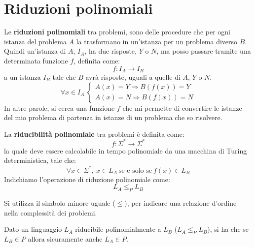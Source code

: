 \section{Riduzioni polinomiali}
Le \textbf{riduzioni polinomiali} tra problemi, sono delle procedure che per ogni
istanza del problema $A$ la trasformano in un'istanza per un problema diverso $B$.
Quindi un'istanza di $A$, $I_A$, ha due risposte, $Y$ o $N$, ma posso passare
tramite una determinata funzione $f$, definita come:
\begin{equation}
    f: I_A \to I_B
\end{equation}
a un istanza $I_B$ tale che $B$ avrà risposte, uguali a quelle di $A$, $Y$ o $N$.
\begin{equation}
    \forall x \in I_A \ \begin{cases}
        A(x) = Y \Rightarrow B(f(x)) = Y \\
        A(x) = N \Rightarrow B(f(x)) = N
    \end{cases}
\end{equation}
In altre parole, si cerca una funzione $f$ che mi permette di convertire le
istanze del mio problema di partenza in istanze di un problema che so risolvere.
\begin{definizione}
    La \textbf{riducibilità polinomiale} tra problemi è definita come:
    \begin{equation}
        f: \Sigma^{\ast} \to \Sigma^{\ast}
    \end{equation}
    la quale deve essere calcolabile in tempo polinomiale da una macchina di
    Turing deterministica, tale che:
    \begin{equation}
        \forall x \in \Sigma^{\ast}, \ x \in L_A \ \text{se e solo se} \
        f(x) \in L_B
    \end{equation}
    Indichiamo l'operazione di riduzione polinomiale come:
    \begin{equation}
        L_A \leq_P L_B
    \end{equation}
\end{definizione}
\begin{osservazione}
    Si utilizza il simbolo minore uguale ($\leq$), per indicare una relazione
    d'ordine nella complessità dei problemi.
\end{osservazione}
\begin{teorema}
    Dato un linguaggio $L_A$ riducibile polinomialmente a $L_B$ ($L_A \leq_P L_B$),
    si ha che se $L_B \in P$ allora sicuramente anche $L_A \in P$.
\end{teorema}

